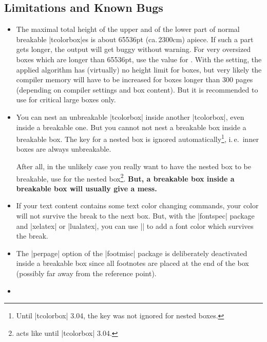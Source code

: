 \subsection{Limitations and Known Bugs}
\begin{itemize}
\item  The maximal total height of the upper and of the lower part
  of normal breakable |tcolorbox|es is about 65536pt (ca.\,2300cm)
  apiece. If such a part gets longer, the output will get buggy
  without warning.
  For very oversized boxes which are longer than 65536pt, use
  the  value for  .
  With the  setting,
  the applied algorithm has (virtually) no height limit for boxes, but
  very likely the compiler memory will have to be increased for boxes longer
  than 300 pages (depending on compiler settings and box content).
  But it is recommended to use  for critical large boxes only.
\item You can nest an unbreakable |tcolorbox| inside another |tcolorbox|,
  even inside a breakable one.
  But you cannot not nest a breakable box inside a breakable box.
  The  key for a nested box is ignored
  automatically\footnote{Until |tcolorbox| 3.04, the  key
  was not ignored for nested boxes.}, i.\,e.\ inner
  boxes are always unbreakable.\par
  After all, in the unlikely case you really want to have the nested box to be breakable,
  use  for the nested
  box\footnote{ acts like  until |tcolorbox| 3.04.}.
  \textbf{But, a breakable box inside a breakable box will usually give a mess.}
\item If your text content contains some text color changing commands,
  your color will not survive the break to the next box.
  But, with the |fontspec| package and |xelatex| or |lualatex|,
  you can use
  ||
  to add a font color which survives the break.
\item{}
  The |perpage| option of the |footmisc| package is deliberately deactivated
  inside a breakable box since all footnotes are placed at the end
  of the box (possibly far away from the reference point).
\item{}

\end{itemize}
